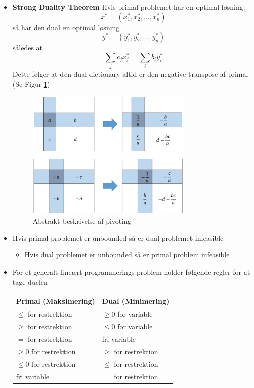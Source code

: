 \begin{itemize}
  \item \textbf{Strong Duality Theorem} Hvis primal problemet har en optimal løsning:
  \begin{equation*}
    x^*= (x_1^*, x_2^*, \dots, x_n^*)
  \end{equation*}	
  så har den dual en optimal løsning
  \begin{equation*}
    y^*= (y_1^*, y_2^*, \dots, y_n^*)
  \end{equation*}	
  således at	
  \begin{equation*}
    \sum_j c_j x_j^* = \sum_i b_i y_i^*
  \end{equation*}	
  Dette følger at den dual dictionary altid er den negative transpose af primal (Se Figur \ref{fig:pivot})  
  \begin{figure}[ht]
    \centering
    \includegraphics[width=300px]{img/pivot}
    \caption{Abstrakt beskrivelse af pivoting\label{fig:pivot}}
  \end{figure}

  \item Hvis primal problemet er unbounded så er dual problemet infeasible
  \begin{itemize}
  	\item Hvis dual problemet er unbounded så er primal problem infeasible
  \end{itemize}
  \item For et generalt lineært programmerings problem holder følgende regler for at tage duelen
  \begin{table}[H]
    \centering
    \begin{tabular}{l|l}
    Primal (Maksimering) & Dual (Minimering) \\ \hline
    $\leq$ for restrektion & $\geq 0$ for variable  \\
    $\geq$ for restrektion & $\leq 0$ for variable  \\
    $=$ for restrektion & fri variable  \\ \hline
    $\geq 0$ for restrektion & $\geq$ for restrektion \\
    $\leq 0$ for restrektion & $\leq$ for restrektion \\
    fri variable & $=$ for restrektion  \\
    \end{tabular}
  \end{table}
\end{itemize}

